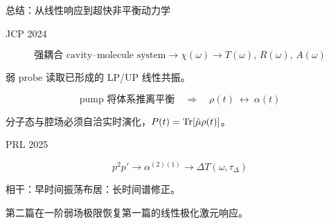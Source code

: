 \begin{frame}{总结：从线性响应到超快非平衡动力学}

  \small
  \setlength{\abovedisplayskip}{2pt}
  \setlength{\belowdisplayskip}{2pt}

  {\scriptsize\color{gray}JCP 2024\par}
  \[
    \text{强耦合 cavity--molecule system}
    \longrightarrow\chi(\omega)
    \longrightarrow T(\omega),\,R(\omega),\,A(\omega)
  \]
  {\centering\scriptsize
    弱 probe 读取已形成的 LP/UP 线性共振。\par}

  \vspace{0.3em}
  \[
    \text{pump 将体系推离平衡}
    \quad\Longrightarrow\quad
    \rho(t)\ \longleftrightarrow\ \alpha(t)
  \]
  {\centering\scriptsize
    分子态与腔场必须自洽实时演化，$P(t)=\operatorname{Tr}[\hat\mu\rho(t)]$。\par}

  \vspace{0.3em}
  {\scriptsize\color{gray}PRL 2025\par}
  \[
    p^2p'
    \longrightarrow\alpha^{(2)(1)}
    \longrightarrow\Delta T(\omega,\tau_\Delta)
  \]
  {\centering\scriptsize
    相干：早时间振荡\qquad 布居：长时间谱修正。\par}

  \vspace{0.4em}
  {\centering\small
    第二篇在一阶弱场极限恢复第一篇的线性极化激元响应。\par}

\end{frame}

